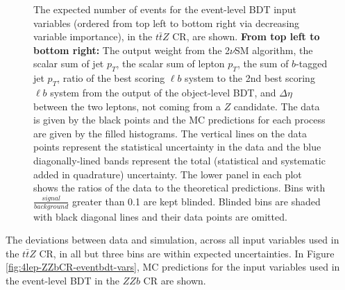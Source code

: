 \begin{figure}[htbp]
\caption{The expected number of events for the event-level BDT input variables (ordered from top left to bottom right via decreasing variable importance), in the $t\bar{t}Z$ CR, are shown. \textbf{From top left to bottom right:} The output weight from the 2$\nu$SM algorithm, the scalar sum of jet $p_{T}$, the scalar sum of lepton $p_{T}$, the sum of $b$-tagged jet $p_{T}$, ratio of the best scoring $\ell b$ system to the 2nd best scoring $\ell b$ system from the output of the object-level BDT, and $\Delta \eta$ between the two leptons, not coming from a $Z$ candidate. The data is given by the black points and the MC predictions for each process are given by the filled histograms. The vertical lines on the data points represent the statistical uncertainty in the data and the blue diagonally-lined bands represent the total (statistical and systematic added in quadrature) uncertainty. The lower panel in each plot shows the ratios of the data to the theoretical predictions. Bins with $\frac{signal}{background}$ greater than 0.1 are kept blinded. Blinded bins are shaded with black diagonal lines and their data points are omitted.}
  \label{fig:4lep-ttZCR-eventbdt-vars}
\end{figure}The deviations between data and simulation, across all input variables used in the $t\bar{t}Z$ CR, in all but three bins are within expected uncertainties. In Figure \ref{fig:4lep-ZZbCR-eventbdt-vars}, MC predictions for the input variables used in the event-level BDT in the $ZZb$ CR are shown.
